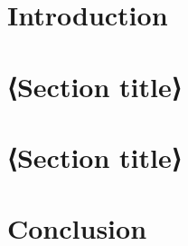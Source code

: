 \documentclass{butex}
\begin{document}
\fairepagedegarde
\fairemarges
\tabledematieres

\section{Introduction}

\section{⟨Section title⟩}

\section{⟨Section title⟩}

\section{Conclusion}

\merci
\end{document}
